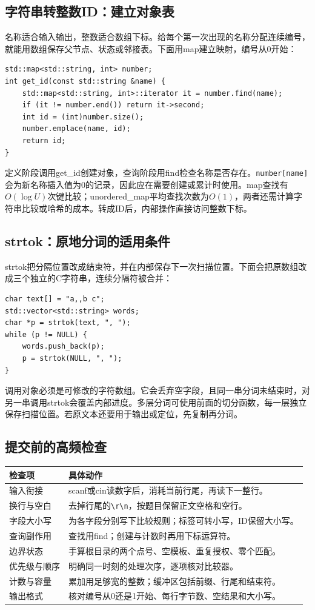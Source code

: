 \subsection{字符串转整数ID：建立对象表}
名称适合输入输出，整数适合数组下标。给每个第一次出现的名称分配连续编号，就能用数组保存父节点、状态或邻接表。下面用map建立映射，编号从0开始：
\begin{lstlisting}
std::map<std::string, int> number;
int get_id(const std::string &name) {
    std::map<std::string, int>::iterator it = number.find(name);
    if (it != number.end()) return it->second;
    int id = (int)number.size();
    number.emplace(name, id);
    return id;
}
\end{lstlisting}
定义阶段调用get\_id创建对象，查询阶段用find检查名称是否存在。\texttt{number[name]}会为新名称插入值为0的记录，因此应在需要创建或累计时使用。map查找有$O(\log U)$次键比较；unordered\_map平均查找次数为$O(1)$，两者还需计算字符串比较或哈希的成本。转成ID后，内部操作直接访问整数下标。

\subsection{strtok：原地分词的适用条件}
strtok把分隔位置改成结束符，并在内部保存下一次扫描位置。下面会把原数组改成三个独立的C字符串，连续分隔符被合并：
\begin{lstlisting}
char text[] = "a,,b c";
std::vector<std::string> words;
char *p = strtok(text, ", ");
while (p != NULL) {
    words.push_back(p);
    p = strtok(NULL, ", ");
}
\end{lstlisting}
调用对象必须是可修改的字符数组。它会丢弃空字段，且同一串分词未结束时，对另一串调用strtok会覆盖内部进度。多层分词可使用前面的切分函数，每一层独立保存扫描位置。若原文本还要用于输出或定位，先复制再分词。

\subsection{提交前的高频检查}
\begin{longtable}{P{3.5cm}P{10.5cm}}
\toprule 检查项 & 具体动作\\\midrule\endhead
输入衔接 & scanf或cin读数字后，消耗当前行尾，再读下一整行。\\
换行与空白 & 去掉行尾的\texttt{\textbackslash r\textbackslash n}，按题目保留正文空格和空行。\\
字段大小写 & 为各字段分别写下比较规则；标签可转小写，ID保留大小写。\\
查询副作用 & 查找用find；创建与计数时再用下标运算符。\\
边界状态 & 手算根目录的两个点号、空模板、重复授权、零个匹配。\\
优先级与顺序 & 明确同一时刻的处理次序，逐项核对比较器。\\
计数与容量 & 累加用足够宽的整数；缓冲区包括前缀、行尾和结束符。\\
输出格式 & 核对编号从0还是1开始、每行字节数、空结果和大小写。\\
\bottomrule\end{longtable}
